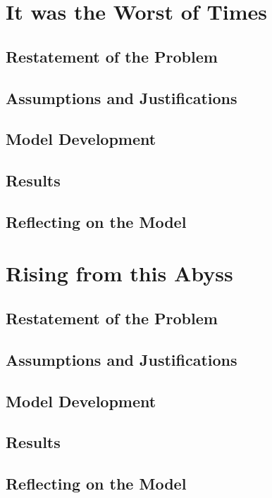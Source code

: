 \documentclass[12pt]{article}
\begin{document}
\newpage

\section{It was the Worst of Times}

\subsection{Restatement of the Problem}
\subsection{Assumptions and Justifications}
\subsection{Model Development}
\subsection{Results}
\subsection{Reflecting on the Model}

\newpage

\section{Rising from this Abyss}

\subsection{Restatement of the Problem}
\subsection{Assumptions and Justifications}
\subsection{Model Development}
\subsection{Results}
\subsection{Reflecting on the Model}

\newpage



\end{document}
